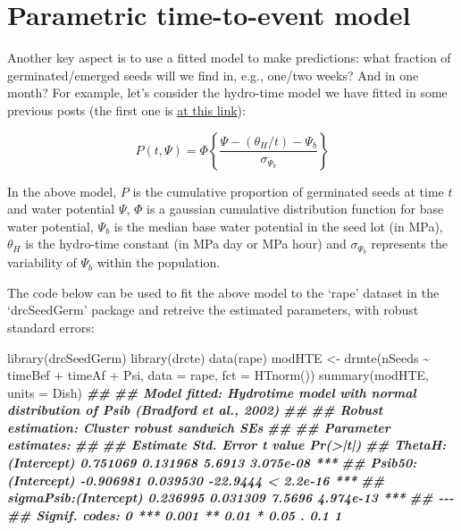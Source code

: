 \documentclass[
]{book}
\newenvironment{Shaded}{\begin{snugshade}}{\end{snugshade}}
\newcommand{\AttributeTok}[1]{\textcolor[rgb]{0.77,0.63,0.00}{#1}}
\newcommand{\DocumentationTok}[1]{\textcolor[rgb]{0.56,0.35,0.01}{\textbf{\textit{#1}}}}
\newcommand{\FunctionTok}[1]{\textcolor[rgb]{0.00,0.00,0.00}{#1}}
\newcommand{\NormalTok}[1]{#1}
\newcommand{\OtherTok}[1]{\textcolor[rgb]{0.56,0.35,0.01}{#1}}
\newcommand{\SpecialCharTok}[1]{\textcolor[rgb]{0.00,0.00,0.00}{#1}}
\begin{document}
\hypertarget{parametric-time-to-event-model}{%
\section{Parametric time-to-event model}\label{parametric-time-to-event-model}}

Another key aspect is to use a fitted model to make predictions: what fraction of germinated/emerged seeds will we find in, e.g., one/two weeks? And in one month? For example, let's consider the hydro-time model we have fitted in some previous posts (the first one is \href{https://www.statforbiology.com/2022/stat_drcte_6-ht1step/}{at this link}):

\[ P(t, \Psi) = \Phi \left\{ \frac{\Psi - (\theta_H / t) -\Psi_b }{\sigma_{\Psi_b}} \right\}\]

In the above model, \(P\) is the cumulative proportion of germinated seeds at time \(t\) and water potential \(\Psi\), \(\Phi\) is a gaussian cumulative distribution function for base water potential, \(\Psi_{b}\) is the median base water potential in the seed lot (in MPa), \(\theta_H\) is the hydro-time constant (in MPa day or MPa hour) and \(\sigma_{\Psi_b}\) represents the variability of \(\Psi_b\) within the population.

The code below can be used to fit the above model to the `rape' dataset in the `drcSeedGerm' package and retreive the estimated parameters, with robust standard errors:

\begin{Shaded}
\begin{Highlighting}[]
\FunctionTok{library}\NormalTok{(drcSeedGerm)}
\FunctionTok{library}\NormalTok{(drcte)}
\FunctionTok{data}\NormalTok{(rape)}
\NormalTok{modHTE }\OtherTok{\textless{}{-}} \FunctionTok{drmte}\NormalTok{(nSeeds }\SpecialCharTok{\textasciitilde{}}\NormalTok{ timeBef }\SpecialCharTok{+}\NormalTok{ timeAf }\SpecialCharTok{+}\NormalTok{ Psi, }
                \AttributeTok{data =}\NormalTok{ rape, }\AttributeTok{fct =} \FunctionTok{HTnorm}\NormalTok{())}
\FunctionTok{summary}\NormalTok{(modHTE, }\AttributeTok{units =}\NormalTok{ Dish)}
\DocumentationTok{\#\# }
\DocumentationTok{\#\# Model fitted: Hydrotime model with normal distribution of Psib (Bradford et al., 2002)}
\DocumentationTok{\#\# }
\DocumentationTok{\#\# Robust estimation: Cluster robust sandwich SEs }
\DocumentationTok{\#\# }
\DocumentationTok{\#\# Parameter estimates:}
\DocumentationTok{\#\# }
\DocumentationTok{\#\#                        Estimate Std. Error  t value  Pr(\textgreater{}|t|)    }
\DocumentationTok{\#\# ThetaH:(Intercept)     0.751069   0.131968   5.6913 3.075e{-}08 ***}
\DocumentationTok{\#\# Psib50:(Intercept)    {-}0.906981   0.039530 {-}22.9444 \textless{} 2.2e{-}16 ***}
\DocumentationTok{\#\# sigmaPsib:(Intercept)  0.236995   0.031309   7.5696 4.974e{-}13 ***}
\DocumentationTok{\#\# {-}{-}{-}}
\DocumentationTok{\#\# Signif. codes:  0 \textquotesingle{}***\textquotesingle{} 0.001 \textquotesingle{}**\textquotesingle{} 0.01 \textquotesingle{}*\textquotesingle{} 0.05 \textquotesingle{}.\textquotesingle{} 0.1 \textquotesingle{} \textquotesingle{} 1}
\end{Highlighting}
\end{Shaded}
\end{document}
